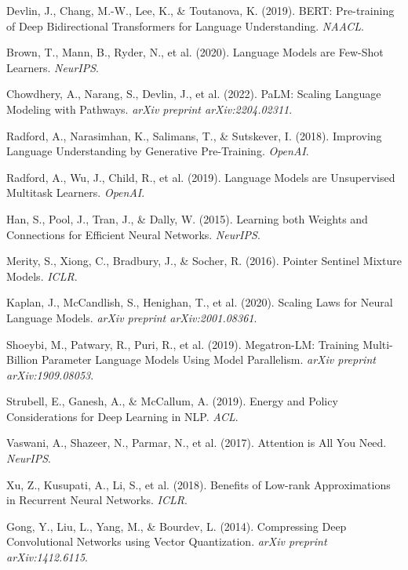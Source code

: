 \documentclass{article}
\begin{document}

\begin{thebibliography}{99}

Devlin, J., Chang, M.-W., Lee, K., \& Toutanova, K. (2019). BERT: Pre-training of Deep Bidirectional Transformers for Language Understanding. \emph{NAACL}.

Brown, T., Mann, B., Ryder, N., et al. (2020). Language Models are Few-Shot Learners. \emph{NeurIPS}.

Chowdhery, A., Narang, S., Devlin, J., et al. (2022). PaLM: Scaling Language Modeling with Pathways. \emph{arXiv preprint arXiv:2204.02311}.

Radford, A., Narasimhan, K., Salimans, T., \& Sutskever, I. (2018). Improving Language Understanding by Generative Pre-Training. \emph{OpenAI}.

Radford, A., Wu, J., Child, R., et al. (2019). Language Models are Unsupervised Multitask Learners. \emph{OpenAI}.

Han, S., Pool, J., Tran, J., \& Dally, W. (2015). Learning both Weights and Connections for Efficient Neural Networks. \emph{NeurIPS}.

Merity, S., Xiong, C., Bradbury, J., \& Socher, R. (2016). Pointer Sentinel Mixture Models. \emph{ICLR}.

Kaplan, J., McCandlish, S., Henighan, T., et al. (2020). Scaling Laws for Neural Language Models. \emph{arXiv preprint arXiv:2001.08361}.

Shoeybi, M., Patwary, R., Puri, R., et al. (2019). Megatron-LM: Training Multi-Billion Parameter Language Models Using Model Parallelism. \emph{arXiv preprint arXiv:1909.08053}.

Strubell, E., Ganesh, A., \& McCallum, A. (2019). Energy and Policy Considerations for Deep Learning in NLP. \emph{ACL}.

Vaswani, A., Shazeer, N., Parmar, N., et al. (2017). Attention is All You Need. \emph{NeurIPS}.

Xu, Z., Kusupati, A., Li, S., et al. (2018). Benefits of Low-rank Approximations in Recurrent Neural Networks. \emph{ICLR}.

Gong, Y., Liu, L., Yang, M., \& Bourdev, L. (2014). Compressing Deep Convolutional Networks using Vector Quantization. \emph{arXiv preprint arXiv:1412.6115}.

\end{thebibliography}
\end{document}
